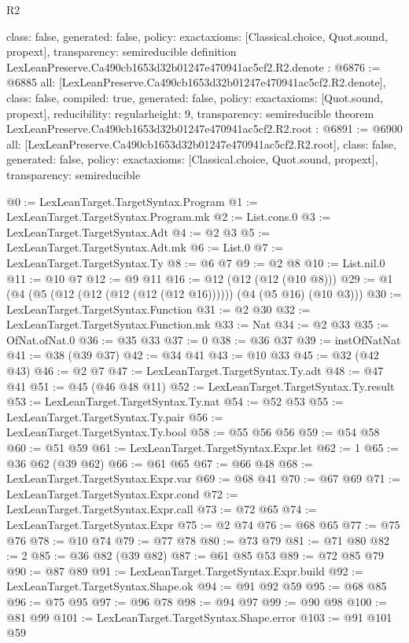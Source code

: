 \begin{lexlean}{R2}
\begin{coremodule}
{  class: false,
  generated: false,
  policy: exact{axioms: [Classical.choice, Quot.sound, propext]},
  transparency: semireducible
}
definition LexLeanPreserve.Ca490cb1653d32b01247e470941ac5cf2.R2.denote : @6876 := @6885 {
  all: [LexLeanPreserve.Ca490cb1653d32b01247e470941ac5cf2.R2.denote],
  class: false,
  compiled: true,
  generated: false,
  policy: exact{axioms: [Quot.sound, propext]},
  reducibility: regular{height: 9},
  transparency: semireducible
}
theorem LexLeanPreserve.Ca490cb1653d32b01247e470941ac5cf2.R2.root : @6891 := @6900 {
  all: [LexLeanPreserve.Ca490cb1653d32b01247e470941ac5cf2.R2.root],
  class: false,
  generated: false,
  policy: exact{axioms: [Classical.choice, Quot.sound, propext]},
  transparency: semireducible
}

@0 := LexLeanTarget.TargetSyntax.Program
@1 := LexLeanTarget.TargetSyntax.Program.mk
@2 := List.cons.{0}
@3 := LexLeanTarget.TargetSyntax.Adt
@4 := @2 @3
@5 := LexLeanTarget.TargetSyntax.Adt.mk
@6 := List.{0}
@7 := LexLeanTarget.TargetSyntax.Ty
@8 := @6 @7
@9 := @2 @8
@10 := List.nil.{0}
@11 := @10 @7
@12 := @9 @11
@16 := @12 (@12 (@12 (@10 @8)))
@29 := @1 (@4 (@5 (@12 (@12 (@12 (@12 (@12 @16)))))) (@4 (@5 @16) (@10 @3)))
@30 := LexLeanTarget.TargetSyntax.Function
@31 := @2 @30
@32 := LexLeanTarget.TargetSyntax.Function.mk
@33 := Nat
@34 := @2 @33
@35 := OfNat.ofNat.{0}
@36 := @35 @33
@37 := 0
@38 := @36 @37
@39 := instOfNatNat
@41 := @38 (@39 @37)
@42 := @34 @41
@43 := @10 @33
@45 := @32 (@42 @43)
@46 := @2 @7
@47 := LexLeanTarget.TargetSyntax.Ty.adt
@48 := @47 @41
@51 := @45 (@46 @48 @11)
@52 := LexLeanTarget.TargetSyntax.Ty.result
@53 := LexLeanTarget.TargetSyntax.Ty.nat
@54 := @52 @53
@55 := LexLeanTarget.TargetSyntax.Ty.pair
@56 := LexLeanTarget.TargetSyntax.Ty.bool
@58 := @55 @56 @56
@59 := @54 @58
@60 := @51 @59
@61 := LexLeanTarget.TargetSyntax.Expr.let
@62 := 1
@65 := @36 @62 (@39 @62)
@66 := @61 @65
@67 := @66 @48
@68 := LexLeanTarget.TargetSyntax.Expr.var
@69 := @68 @41
@70 := @67 @69
@71 := LexLeanTarget.TargetSyntax.Expr.cond
@72 := LexLeanTarget.TargetSyntax.Expr.call
@73 := @72 @65
@74 := LexLeanTarget.TargetSyntax.Expr
@75 := @2 @74
@76 := @68 @65
@77 := @75 @76
@78 := @10 @74
@79 := @77 @78
@80 := @73 @79
@81 := @71 @80
@82 := 2
@85 := @36 @82 (@39 @82)
@87 := @61 @85 @53
@89 := @72 @85 @79
@90 := @87 @89
@91 := LexLeanTarget.TargetSyntax.Expr.build
@92 := LexLeanTarget.TargetSyntax.Shape.ok
@94 := @91 @92 @59
@95 := @68 @85
@96 := @75 @95
@97 := @96 @78
@98 := @94 @97
@99 := @90 @98
@100 := @81 @99
@101 := LexLeanTarget.TargetSyntax.Shape.error
@103 := @91 @101 @59

\end{coremodule}
\end{lexlean}
